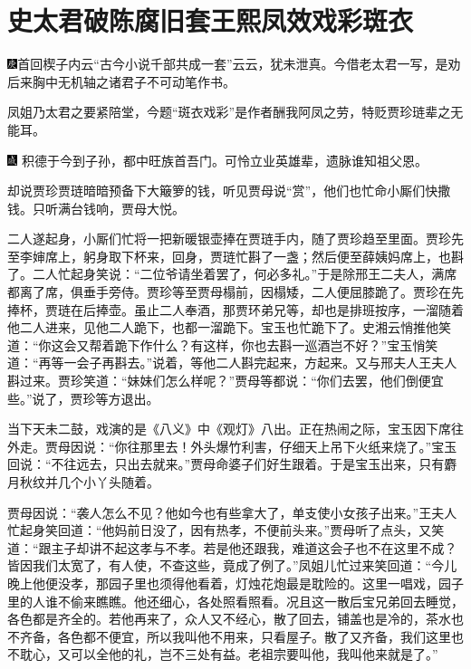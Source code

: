

\chapter{史太君破陈腐旧套\hspace{.5em}王熙凤效戏彩斑衣}

{\includegraphics[width=3mm]{../Images/00004}首回楔子内云``古今小说千部共成一套''云云，犹未泄真。今借老太君一写，是劝后来胸中无机轴之诸君子不可动笔作书。}

{凤姐乃太君之要紧陪堂，今题``斑衣戏彩''是作者酬我阿凤之劳，特贬贾珍琏辈之无能耳。}

{\includegraphics[width=3mm]{../Images/00005}  \kaishu 积德于今到子孙，都中旺族首吾门。可怜立业英雄辈，遗脉谁知祖父恩。}

却说贾珍贾琏暗暗预备下大簸箩的钱，听见贾母说``赏''，他们也忙命小厮们快撒钱。只听满台钱响，贾母大悦。

二人遂起身，小厮们忙将一把新暖银壶捧在贾琏手内，随了贾珍趋至里面。贾珍先至李婶席上，躬身取下杯来，回身，贾琏忙斟了一盏；然后便至薛姨妈席上，也斟了。二人忙起身笑说：``二位爷请坐着罢了，何必多礼。''于是除邢王二夫人，满席都离了席，俱垂手旁侍。贾珍等至贾母榻前，因榻矮，二人便屈膝跪了。贾珍在先捧杯，贾琏在后捧壶。虽止二人奉酒，那贾环弟兄等，却也是排班按序，一溜随着他二人进来，见他二人跪下，也都一溜跪下。宝玉也忙跪下了。史湘云悄推他笑道：``你这会又帮着跪下作什么？有这样，你也去斟一巡酒岂不好？''宝玉悄笑道：``再等一会子再斟去。''说着，等他二人斟完起来，方起来。又与邢夫人王夫人斟过来。贾珍笑道：``妹妹们怎么样呢？''贾母等都说：``你们去罢，他们倒便宜些。''说了，贾珍等方退出。

当下天未二鼓，戏演的是《八义》中《观灯》八出。正在热闹之际，宝玉因下席往外走。贾母因说：``你往那里去！外头爆竹利害，仔细天上吊下火纸来烧了。''宝玉回说：``不往远去，只出去就来。''贾母命婆子们好生跟着。于是宝玉出来，只有麝月秋纹并几个小丫头随着。

贾母因说：``袭人怎么不见？他如今也有些拿大了，单支使小女孩子出来。''王夫人忙起身笑回道：``他妈前日没了，因有热孝，不便前头来。''贾母听了点头，又笑道：``跟主子却讲不起这孝与不孝。若是他还跟我，难道这会子也不在这里不成？皆因我们太宽了，有人使，不查这些，竟成了例了。''凤姐儿忙过来笑回道：``今儿晚上他便没孝，那园子里也须得他看着，灯烛花炮最是耽险的。这里一唱戏，园子里的人谁不偷来瞧瞧。他还细心，各处照看照看。况且这一散后宝兄弟回去睡觉，各色都是齐全的。若他再来了，众人又不经心，散了回去，铺盖也是冷的，茶水也不齐备，各色都不便宜，所以我叫他不用来，只看屋子。散了又齐备，我们这里也不耽心，又可以全他的礼，岂不三处有益。老祖宗要叫他，我叫他来就是了。''

